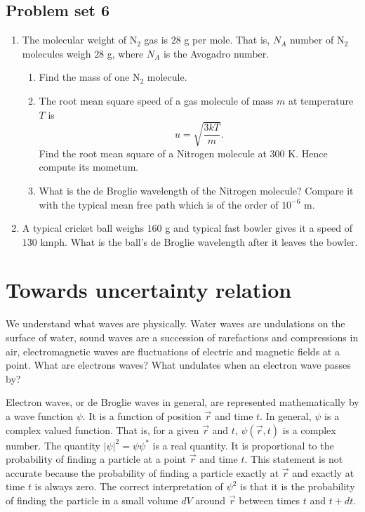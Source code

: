 \subsection{Problem set 6}
\begin{enumerate}
\item The molecular weight of N$_2$ gas is $28$ g per mole. That is, $N_A$ 
number of N$_2$ molecules weigh $28$ g, where $N_A$ is the Avogadro number.
\begin{enumerate}
\item Find the mass of one N$_2$ molecule.
\item The root mean square speed of a gas molecule of mass $m$ at temperature
$T$ is
\begin{equation}
u = \sqrt{\frac{3kT}{m}}.
\end{equation}
Find the root mean square of a Nitrogen molecule at $300$ K. Hence compute its
mometum.
\item What is the de Broglie wavelength of the Nitrogen molecule? Compare it 
with the typical mean free path which is of the order of $10^{-6}$ m.
\end{enumerate}

\item A typical cricket ball weighs $160$ g and typical fast bowler gives it a
speed of $130$ kmph. What is the ball's de Broglie wavelength after it 
leaves the bowler.
\end{enumerate}

\section{Towards uncertainty relation}\label{c2s6}
We understand what waves are physically. Water waves are undulations on the
surface of water, sound waves are a succession of rarefactions and compressions
in air, electromagnetic waves are fluctuations of electric and magnetic fields
at a point. What are electrons waves? What undulates when an electron wave 
passes by?

Electron waves, or de Broglie waves in general, are represented mathematically
by a wave function $\psi$. It is a function of position $\vec{r}$ and time $t$.
In general, $\psi$ is a complex valued function. That is, for a given $\vec{r}$
and $t$, $\psi(\vec{r}, t)$ is a complex number. The quantity $|\psi|^2 = \psi
\psi^\ast$ is a real quantity. It is proportional to the probability of finding
a particle at a point $\vec{r}$ and time $t$. This statement is not accurate
because the probability of finding a particle exactly at $\vec{r}$ and exactly
at time $t$ is always zero. The correct interpretation of $\psi^2$ is that
it is the probability of finding the particle in a small volume $dV$ around
$\vec{r}$ between times $t$ and $t + dt$. 

